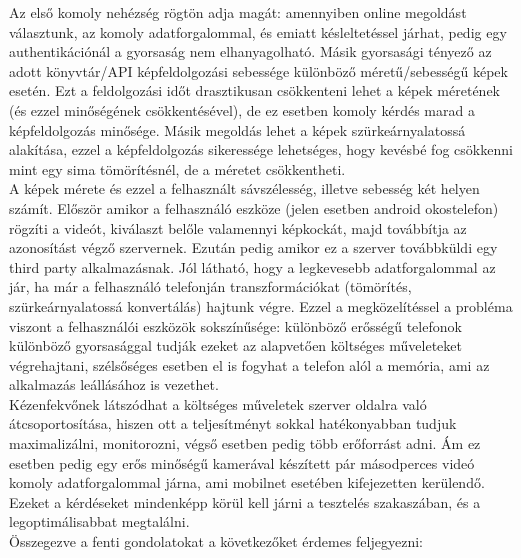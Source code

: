 Az első komoly nehézség rögtön adja magát: amennyiben online megoldást választunk, az komoly adatforgalommal, és emiatt késleltetéssel járhat, pedig egy authentikációnál a gyorsaság nem elhanyagolható. Másik gyorsasági tényező az adott könyvtár/API képfeldolgozási sebessége különböző méretű/sebességű képek esetén. Ezt a feldolgozási időt drasztikusan csökkenteni lehet a képek méretének (és ezzel minőségének csökkentésével), de ez esetben komoly kérdés marad a képfeldolgozás minősége. Másik megoldás lehet a képek szürkeárnyalatossá alakítása, ezzel a képfeldolgozás sikeressége lehetséges, hogy kevésbé fog csökkenni mint egy sima tömörítésnél, de a méretet csökkentheti.
\\A képek mérete és ezzel a felhasznált sávszélesség, illetve sebesség két helyen számít. Először amikor a felhasználó eszköze (jelen esetben android okostelefon) rögzíti a videót, kiválaszt belőle valamennyi képkockát, majd továbbítja az azonosítást végző szervernek. Ezután pedig amikor ez a szerver továbbküldi egy third party alkalmazásnak. Jól látható, hogy a legkevesebb adatforgalommal az jár, ha már a felhasználó telefonján transzformációkat (tömörítés, szürkeárnyalatossá konvertálás) hajtunk végre. Ezzel a megközelítéssel a probléma viszont a felhasználói eszközök sokszínűsége: különböző erősségű telefonok különböző gyorsasággal tudják ezeket az alapvetően költséges műveleteket végrehajtani, szélsőséges esetben el is fogyhat a telefon alól a memória, ami az alkalmazás leállásához is vezethet.
\\Kézenfekvőnek látszódhat a költséges műveletek szerver oldalra való átcsoportosítása, hiszen ott a teljesítményt sokkal hatékonyabban tudjuk maximalizálni, monitorozni, végső esetben pedig több erőforrást adni. Ám ez esetben pedig egy erős minőségű kamerával készített pár másodperces videó komoly adatforgalommal járna, ami mobilnet esetében kifejezetten kerülendő.
Ezeket a kérdéseket mindenképp körül kell járni a tesztelés szakaszában, és a legoptimálisabbat megtalálni.
\\Összegezve  a fenti gondolatokat a következőket érdemes feljegyezni:

